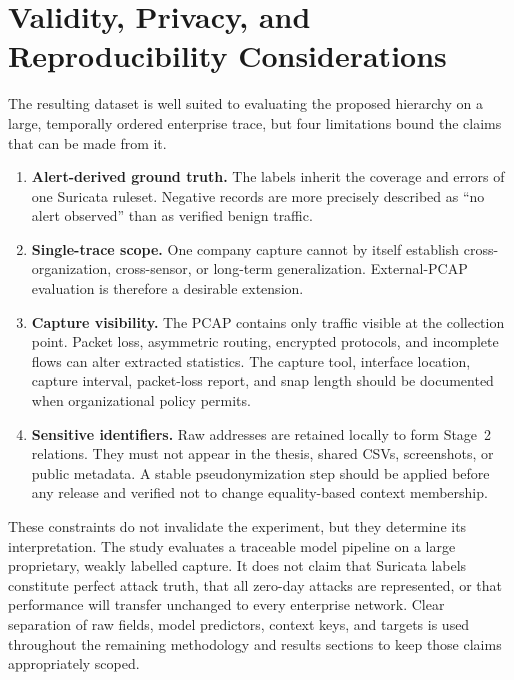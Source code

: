 \documentclass[11pt,fleqn]{report}
\begin{document}
\section{Validity, Privacy, and Reproducibility Considerations}
\label{subsec:dataset_limitations}

The resulting dataset is well suited to evaluating the proposed hierarchy on
a large, temporally ordered enterprise trace, but four limitations bound the
claims that can be made from it.

\begin{enumerate}[label=\textbf{L\arabic*:},leftmargin=*]
    \item \textbf{Alert-derived ground truth.} The labels inherit the coverage
    and errors of one Suricata ruleset. Negative records are more precisely
    described as ``no alert observed'' than as verified benign traffic.

    \item \textbf{Single-trace scope.} One company capture cannot by itself
    establish cross-organization, cross-sensor, or long-term generalization.
    External-PCAP evaluation is therefore a desirable extension.

    \item \textbf{Capture visibility.} The PCAP contains only traffic visible
    at the collection point. Packet loss, asymmetric routing, encrypted
    protocols, and incomplete flows can alter extracted statistics. The
    capture tool, interface location, capture interval, packet-loss report, and
    snap length should be documented when organizational policy permits.

    \item \textbf{Sensitive identifiers.} Raw addresses are retained locally
    to form Stage~2 relations. They must not appear in the thesis, shared CSVs,
    screenshots, or public metadata. A stable pseudonymization step should be
    applied before any release and verified not to change equality-based
    context membership.
\end{enumerate}

These constraints do not invalidate the experiment, but they determine its
interpretation. The study evaluates a traceable model pipeline on a large
proprietary, weakly labelled capture. It does not claim that Suricata labels
constitute perfect attack truth, that all zero-day attacks are represented, or
that performance will transfer unchanged to every enterprise network. Clear
separation of raw fields, model predictors, context keys, and targets is used
throughout the remaining methodology and results sections to keep those claims
appropriately scoped.
\end{document}

